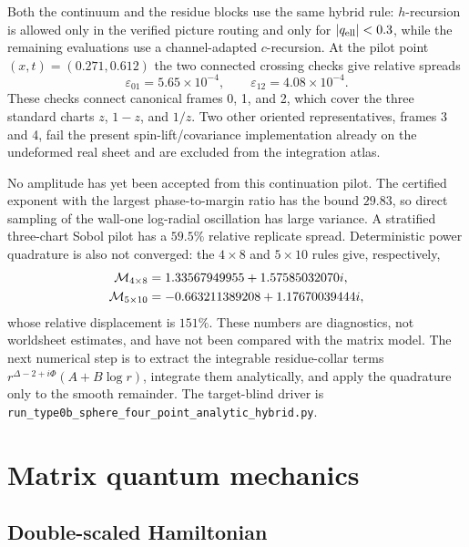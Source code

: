 \documentclass[11pt]{article}
\begin{document}
Both the continuum and the residue blocks use the same hybrid rule:
$h$-recursion is allowed only in the verified picture routing and only for
$|q_{\rm ell}|<0.3$, while the remaining evaluations use a channel-adapted
$c$-recursion.  At the pilot point $(x,t)=(0.271,0.612)$ the two connected
crossing checks give relative spreads
\begin{equation}
 \varepsilon_{01}=5.65\times10^{-4},
 \qquad
 \varepsilon_{12}=4.08\times10^{-4}.
 \label{eq:type0b-analytic-hybrid-crossing}
\end{equation}
These checks connect canonical frames 0, 1, and 2, which cover the three
standard charts $z$, $1-z$, and $1/z$.  Two other oriented representatives,
frames 3 and 4, fail the present spin-lift/covariance implementation already
on the undeformed real sheet and are excluded from the integration atlas.

No amplitude has yet been accepted from this continuation pilot.  The
certified exponent with the largest phase-to-margin ratio has the bound
$29.83$, so direct sampling of the wall-one log-radial oscillation has large
variance.  A stratified three-chart Sobol pilot has a $59.5\%$ relative
replicate spread.  Deterministic power quadrature is also not converged:
the $4\times8$ and $5\times10$ rules give, respectively,
\begin{align}
 \mathcal M_{4\times8}&=1.33567949955+1.57585032070i,
 \notag\\
 \mathcal M_{5\times10}&=-0.663211389208+1.17670039444i,
 \label{eq:type0b-analytic-hybrid-unconverged-controls}
\end{align}
whose relative displacement is $151\%$.  These numbers are diagnostics,
not worldsheet estimates, and have not been compared with the matrix model.
The next numerical step is to extract the integrable residue-collar terms
$r^{\Delta-2+i\Phi}(A+B\log r)$, integrate them analytically, and apply the
quadrature only to the smooth remainder.  The target-blind driver is
\texttt{run\_type0b\_sphere\_four\_point\_analytic\_hybrid.py}.

\section{Matrix quantum mechanics}

\subsection{Double-scaled Hamiltonian}
\end{document}
